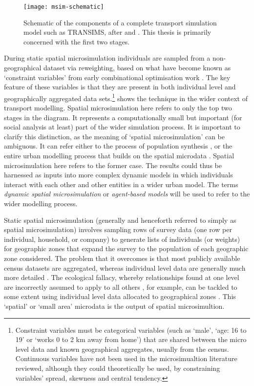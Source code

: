 \begin{figure}[h]
 \centering
 \texttt{[image: msim-schematic]}
 \caption[Schematic a transport simulation model]{Schematic
of the components of a complete transport simulation model such as
TRANSIMS, after \citet{nagel1999transims} and \citet{Mohammadian2010}.
This thesis is primarily concerned with the first two stages.}
 \label{f:msim-schematic}
\end{figure}

During static spatial microsimulation individuals are sampled from a non-geographical
dataset via  reweighting, based on what have become known as `constraint variables'
from early combinational optimisation work \citep{Williamson1998}. The key
feature of these variables is that they are present in
both individual level and geographically aggregated data
sets.\footnote{Constraint
variables must be categorical variables (such as
`male', `age: 16 to 19' or `works 0 to 2 km away from home')
that are shared between the micro level data and
known geographical aggregates, usually from the census.
Continuous variables have not been used in the microsimualtion
literature reviewed, although they could theoretically be
used, by constraining variables' spread, skewness
and central tendency.
}
 shows the technique in the wider context of
transport modelling. Spatial microsimulation
here refers to only the top two stages in the diagram. It represents a
computationally small but important (for social analysis at least)
part of the wider simulation process. It is important to clarify this
distinction, as the meaning of `spatial microsimulation' can be ambiguous.
It can refer
either to the process of population synthesis
\citep{chin2006regional, Ballas2005c, Hynes2008},
or the entire urban modelling process that
builds on the spatial microdata \citep{Wegener2011}.
Spatial microsimulation here refers to the former case. The results could
thus be harnessed as inputs into more complex dynamic models in which
individuals interact with each other and other entities in a wider urban model.
The terms \emph{dynamic spatial microsimulation} or \emph{agent-based models}
will be used to refer to the wider modelling process.

Static spatial microsimulation (generally and henceforth referred to simply as
spatial microsimulation) involves sampling rows of
survey data (one row per individual, household, or company) to generate lists of
individuals (or weights) for geographic zones that expand the survey to the
population of each geographic zone considered. The
problem that it overcomes is that most publicly available
census datasets are aggregated, whereas individual level data are generally
much more detailed \citep{ballas2003microsimulation-30-years}.
The ecological fallacy, whereby relationships found at one level are 
incorrectly assumed to apply to all others \citep{Openshaw1983}, for example, can be tackled
to some extent using individual level data allocated to geographical zones
\citep{Hermes2012a}. This `spatial' or `small area' microdata is the output
of spatial microsimultion.

